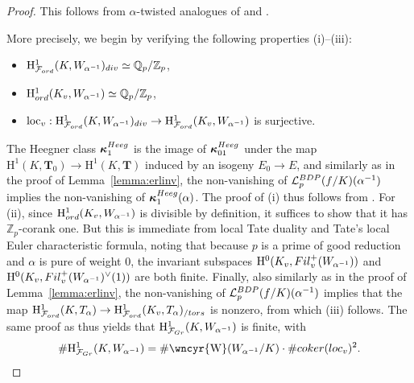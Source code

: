 \documentclass[10pt,reqno]{amsart}
\numberwithin{equation}{section}
\theoremstyle{plain}
\theoremstyle{definition}
\theoremstyle{definition}
\theoremstyle{plain}
\theoremstyle{plain}
\theoremstyle{plain}
\theoremstyle{plain}
\theoremstyle{plain}
\theoremstyle{plain}
\newcommand{\al}{\alpha} %
\newcommand{\Z}{\mathbb{Z}}
\newcommand{\Q}{\mathbb{Q}}
\newcommand{\bkappa}{\boldsymbol{\kappa}}
\newcommand{\sha}{\text{\wncyr{W}}}
\DeclareMathOperator{\loc}{loc}
\newcommand{\Lcal}{\mathcal{L}}
\newcommand{\Fcal}{\mathcal{F}}
\newcommand{\rH}{\mathrm{H}}
\begin{document}
\begin{proof}
This follows from $\al$-twisted analogues of \cite[Prop.\,3.2.1]{jsw} and \cite[Thm.\,3.3.1]{jsw}. 

More precisely, we begin by verifying the following properties (i)--(iii): 
\begin{itemize}
\item[(i)] $\rH^1_{\Fcal_{\rm ord}}(K, W_{\al^{-1}})_{\rm div}\simeq \Q_p/\Z_p$,
\item[(ii)] $\rH^1_{{\rm ord}}(K_v, W_{\al^{-1}})\simeq  \Q_p/\Z_p$, %
\item[(iii)] {$\loc_v: \rH^1_{\Fcal_{\rm ord}}(K, W_{\al^{-1}})_{\rm div} \to \rH^1_{\Fcal_{\rm ord}}(K_v, W_{\al^{-1}})$ is surjective.}
\end{itemize}

The Heegner class $\bkappa_1^{\rm Heeg}$ is the image of $\bkappa_{01}^{\rm Heeg}$ under the map $\rH^1(K,\mathbf{T}_0)\rightarrow\rH^1(K,\mathbf{T})$ induced by an isogeny $E_0\rightarrow E$, and similarly as in the proof of Lemma~\ref{lemma:erlinv}, the non-vanishing of $\Lcal_p^{\rm BDP}(f/K)(\al^{-1})$ implies the non-vanishing of $\bkappa^{\rm Heeg}_1(\al)$. The proof of (i) thus follows from \cite[Thm.~6.1.1]{eisenstein_cyc}. %
For (ii), since $\rH^1_{\rm ord}(K_v,W_{\al^{-1}})$ is divisible by definition, it suffices to show that it has $\Z_p$-corank one. But this is immediate from local Tate duality and Tate's local Euler characteristic formula, noting that because $p$ is a prime of good reduction and $\alpha$ is pure of weight $0$, the invariant subspaces $\rH^0(K_v,{\rm Fil}_v^+(W_{\al^{-1}}))$ and $\rH^0(K_v,{\rm Fil}_v^+(W_{\al^{-1}})^\vee(1))$ are both finite.
%
Finally, also similarly as in the proof of Lemma~\ref{lemma:erlinv}, the non-vanishing of $\Lcal_p^{\rm BDP}(f/K)(\al^{-1})$ implies that the map $\rH^1_{\Fcal_{\rm ord}}(K,T_{\al})\rightarrow\rH^1_{\Fcal_{\rm ord}}(K_v,T_{\al})_{/{\rm tors}}$ is nonzero, from which (iii) follows. The same proof as \cite[Prop.~3.2.1]{jsw} thus yields that $\rH^1_{\Fcal_{\rm Gr}}(K,W_{\al^{-1}})$ is finite, with
\begin{equation}\label{eq:321}
\#\rH^1_{\Fcal_{\rm Gr}}(K,W_{\al^{-1}})=\#\sha(W_{\al^{-1}}/K)\cdot\#{\rm coker}({\rm loc}_{v})^2.
\end{equation}


\end{proof}
\end{document}
